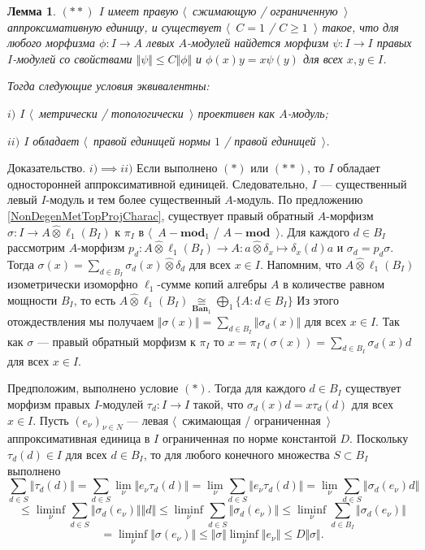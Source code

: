 \documentclass[12pt]{article}
\numberwithin{equation}{subsection}
\theoremstyle{plain}
\newtheorem{lemma}{Лемма}
\newenvironment{proof}{Доказательство.}{}
\newcommand{\projtens}{\mathbin{\widehat{\otimes}}}
\newcommand{\isom}[1]{\mathop{\mathbin{\cong}}\limits_{#1}}
\begin{document}
\begin{fulltext}
\begin{lemma}
$(**)$ $I$ имеет правую $\langle$~сжимающую / ограниченную~$\rangle$ аппроксимативную единицу, и существует $\langle$~$C=1$ / $C\geq 1$~$\rangle$ такое, что для любого морфизма $\phi:I\to A$ левых $A$-модулей найдется морфизм $\psi:I\to I$ правых $I$-модулей со свойствами $\Vert\psi\Vert\leq C\Vert\phi\Vert$ и $\phi(x)y=x\psi(y)$ для всех $x,y\in I$.

Тогда следующие условия эквивалентны:

$i)$ $I$ $\langle$~метрически / топологически~$\rangle$ проективен как $A$-модуль;

$ii)$ $I$ обладает $\langle$~правой единицей нормы $1$ / правой единицей~$\rangle$.
\end{lemma} 
\begin{proof} $i)$$\implies$$ii)$ Если выполнено $(*)$ или $(**)$, то $I$ обладает односторонней аппроксимативной единицей. Следовательно, $I$ --- существенный левый $I$-модуль и тем более существенный $A$-модуль. По предложению \ref{NonDegenMetTopProjCharac}, существует правый обратный $A$-морфизм $\sigma:I\to A\projtens \ell_1(B_I)$ к $\pi_I$ в $\langle$~$A-\mathbf{mod}_1$ / $A-\mathbf{mod}$~$\rangle$. Для каждого $d\in B_I$ рассмотрим $A$-морфизм $p_d:A\projtens \ell_1(B_I)\to A:a\projtens \delta_x\mapsto \delta_x(d)a$ и $\sigma_d=p_d\sigma$. Тогда $\sigma(x)=\sum_{d\in B_I}\sigma_d(x)\projtens \delta_d$ для всех $x\in I$. Напомним, что $A\projtens\ell_1(B_I)$ изометрически изоморфно $\ell_1$-сумме копий алгебры $A$ в количестве равном мощности $B_I$, то есть $A\projtens\ell_1(B_I)\isom{\mathbf{Ban}_1}\bigoplus_1\{A:d\in B_I\}$ Из этого отождествления мы получаем $\Vert\sigma(x)\Vert=\sum_{d\in B_I} \Vert\sigma_d(x)\Vert$ для всех $x\in I$. Так как $\sigma$ --- правый обратный морфизм к $\pi_I$ то $x=\pi_I(\sigma(x))=\sum_{d\in B_I}\sigma_d(x)d$ для всех $x\in I$. 

Предположим, выполнено условие $(*)$. Тогда для каждого $d\in B_I$ существует морфизм правых $I$-модулей $\tau_d:I\to I$ такой, что $\sigma_d(x)d=x\tau_d(d)$ для всех $x\in I$.  Пусть $(e_\nu)_{\nu\in N}$ --- левая $\langle$~сжимающая / ограниченная~$\rangle$ аппроксимативная единица в $I$ ограниченная по норме константой $D$. Поскольку $\tau_d(d)\in I$ для всех $d\in B_I$, то для любого конечного множества $S\subset B_I$ выполнено
$$
\sum_{d\in S}\Vert \tau_d(d)\Vert
=\sum_{d\in S}\lim_{\nu}\Vert e_\nu \tau_d(d) \Vert
=\lim_{\nu}\sum_{d\in S}\Vert e_\nu \tau_d(d)\Vert
=\lim_{\nu}\sum_{d\in S}\Vert \sigma_d(e_\nu)d \Vert
$$
$$
\leq\liminf_{\nu}\sum_{d\in S}\Vert\sigma_d(e_\nu)\Vert\Vert d\Vert 
\leq\liminf_{\nu}\sum_{d\in S}\Vert\sigma_d(e_\nu)\Vert
\leq\liminf_{\nu}\sum_{d\in B_I}\Vert\sigma_d(e_\nu)\Vert
$$
$$
=\liminf_{\nu}\Vert\sigma(e_\nu)\Vert
\leq\Vert\sigma\Vert\liminf_{\nu}\Vert e_\nu\Vert
\leq D\Vert\sigma\Vert.
$$


\end{proof}
\end{fulltext}
\end{document}
